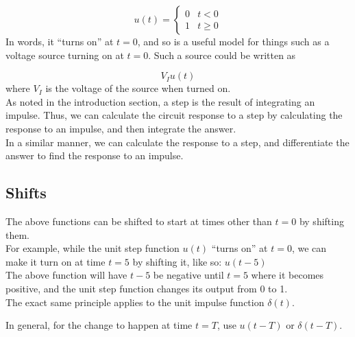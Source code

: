 \documentclass[12pt,a4paper]{report}
\begin{document}
\[ u(t) = 
  \begin{cases}
   0  & t < 0 \\
   1  & t \ge 0
  \end{cases}
\]
In words, it ``turns on'' at $t = 0$, and so is a useful model for things such as a voltage source turning on at $t = 0$. Such a source could be written as

\[ V_I u(t) \]
where $V_I$ is the voltage of the source when turned on.\\

As noted in the introduction section, a step is the result of integrating an impulse. Thus, we can calculate the circuit response to a step by calculating the response to an impulse, and then integrate the answer.\\
In a similar manner, we can calculate the response to a step, and differentiate the answer to find the response to an impulse.

\subsection{Shifts}
The above functions can be shifted to start at times other than $t = 0$ by shifting them.\\
For example, while the unit step function $u(t)$ ``turns on'' at $t = 0$, we can make it turn on at time $t = 5$ by shifting it, like so: $u(t - 5)$\\
The above function will have $t - 5$ be negative until $t = 5$ where it becomes positive, and the unit step function changes its output from 0 to 1.\\
The exact same principle applies to the unit impulse function $\delta(t)$.

In general, for the change to happen at time $t = T$, use $u(t - T)$ or $\delta(t - T)$.
\end{document}
